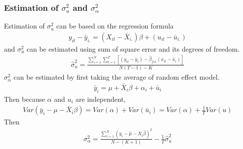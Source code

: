 \documentclass[a4paper]{article}
\begin{document}
\subsubsection{Estimation of $\sigma^2_{u}$ and $\sigma^2_{\alpha}$}
Estimation of $\sigma^2_{u}$ can be based on the regression formula
\begin{align*}
y_{it} - \bar y_{i.} = (X_{it} - \bar X_{i.}) \beta+  (u_{it} - \bar u_{i.})
\end{align*}
and $\sigma^2_u$ can be estimated using sum of square error and its degrees of freedom.
\begin{align*}
\hat \sigma^2_u = \frac{\sum_{i=1}^N \sum_{t=1}^T [(y_{it} - \bar y_i) - \hat \beta_{fix}(x_{it}-\bar x_i)]}{N(T-1) -K}
\end{align*}
$\sigma^2_{\alpha}$ can be estimated by first taking the average of random effect model.
\begin{align*}
\bar y_{i} = \mu + \bar X_i \beta + \alpha_i + \bar u_{i}
\end{align*}
Then because $\alpha$ and $u_{i}$ are independent, 
\begin{align*}
Var(\bar y_i - \mu - \bar X_i \beta) = Var(\alpha) + Var(\bar u_{i}) = Var(\alpha) + \frac{1}{T}Var(u) 
\end{align*}
Then
\begin{align*}
\sigma^2_{\alpha} = \frac{\sum_{i=1}^N(\bar y_i - \hat \mu - X_i \hat \beta)^2}{N-(K+1)} -\frac{1}{T}\hat \sigma^2_u
\end{align*}
\end{document}
